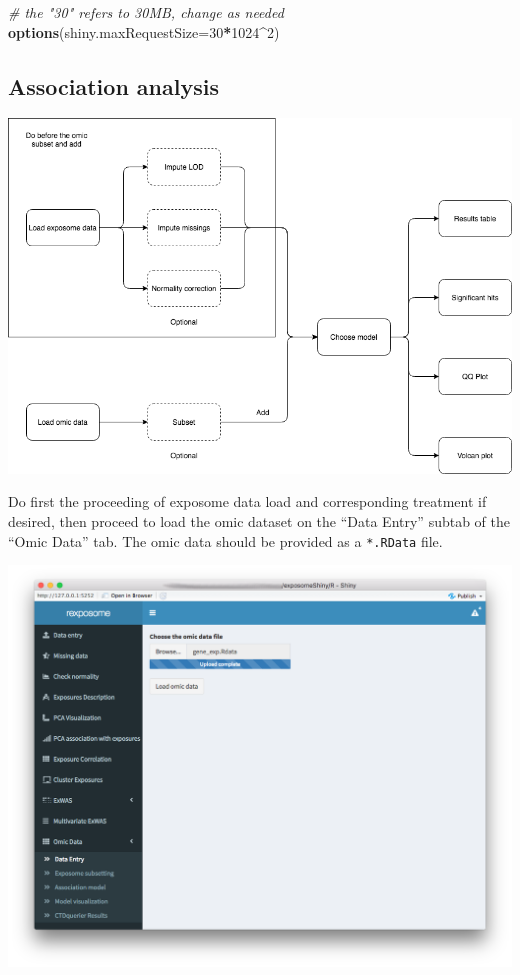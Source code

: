 \documentclass[
]{book}
\newenvironment{Shaded}{\begin{snugshade}}{\end{snugshade}}
\newcommand{\CommentTok}[1]{\textcolor[rgb]{0.56,0.35,0.01}{\textit{#1}}}
\newcommand{\DataTypeTok}[1]{\textcolor[rgb]{0.13,0.29,0.53}{#1}}
\newcommand{\DecValTok}[1]{\textcolor[rgb]{0.00,0.00,0.81}{#1}}
\newcommand{\KeywordTok}[1]{\textcolor[rgb]{0.13,0.29,0.53}{\textbf{#1}}}
\newcommand{\NormalTok}[1]{#1}
\newcommand{\OperatorTok}[1]{\textcolor[rgb]{0.81,0.36,0.00}{\textbf{#1}}}
\begin{document}
\begin{Shaded}
\begin{Highlighting}[]
  \CommentTok{# the "30" refers to 30MB, change as needed}
\KeywordTok{options}\NormalTok{(}\DataTypeTok{shiny.maxRequestSize=}\DecValTok{30}\OperatorTok{*}\DecValTok{1024}\OperatorTok{^}\DecValTok{2}\NormalTok{)}
\end{Highlighting}
\end{Shaded}

\hypertarget{association-analysis}{%
\subsection{Association analysis}\label{association-analysis}}

\includegraphics{images/analysis9_1.png}

Do first the proceeding of exposome data load and corresponding treatment if desired, then proceed to load the omic dataset on the ``Data Entry'' subtab of the ``Omic Data'' tab. The omic data should be provided as a \texttt{*.RData} file.

\includegraphics{images/analysis9_2.png}
\end{document}

